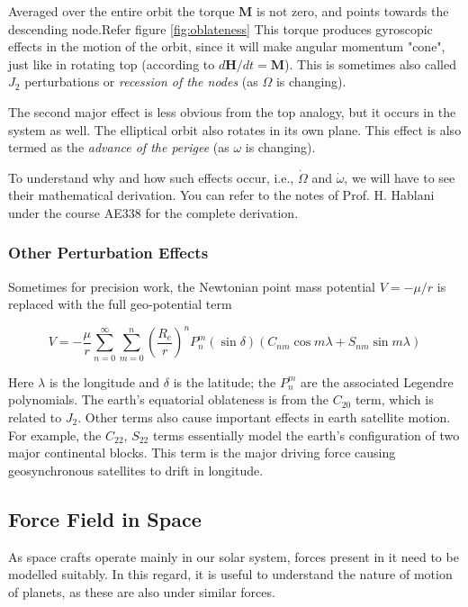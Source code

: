 \documentclass{article}
\theoremstyle{definition}
\begin{document}
Averaged over the entire orbit the torque $\boldsymbol{M}$ is not zero, and points towards the descending node.Refer figure \ref{fig:oblateness} This torque produces gyroscopic effects in the motion of the orbit, since it will make angular momentum "cone", just like in rotating top (according to $d\boldsymbol{H}/dt = \boldsymbol{M}$). This is sometimes also called $J_2$ perturbations or \emph{recession of the nodes} (as $\Omega$ is changing).

The second major effect is less obvious from the top analogy, but it occurs in the system as well. The elliptical orbit also rotates in its own plane.
This effect is also termed as the \emph{advance of the perigee} (as $\omega$ is changing).

To understand why and how such effects occur, i.e., $\Dot{\Omega}$ and $\Dot{\omega}$, we will have to see their mathematical derivation. You can refer to the notes of  Prof. H. Hablani under the course AE338 for the complete derivation.

\subsubsection{Other Perturbation Effects}

Sometimes for precision work, the Newtonian point mass potential $V= -\mu /r$ is replaced with the full geo-potential term

\begin{equation}
    V= -\frac{\mu}{r}\sum_{n=0}^{\infty} \sum_{m=0}^{n} \left(\frac{R_e}{r}\right)^n P_{n}^{m}(\sin{\delta}) (C_{nm}\cos{m\lambda} + S_{nm}\sin{m\lambda})
\end{equation}

Here $\lambda$ is the longitude and $\delta$ is the latitude; the $P_{n}^{m}$ are the associated Legendre polynomials. The earth's equatorial oblateness is from the $C_{20}$ term, which is related to $J_2$. Other terms also cause important effects in earth satellite motion.  
For example, the $C_{22}$, $S_{22}$ terms essentially model the earth's configuration of two major continental blocks. This term is the major driving force causing geosynchronous satellites to drift in longitude.

\subsection{Force Field in Space}

As space crafts operate mainly in our solar system, forces present in it need to be modelled suitably.
In this regard, it is useful to understand the nature of motion of planets, as these are also under similar forces.
\end{document}

